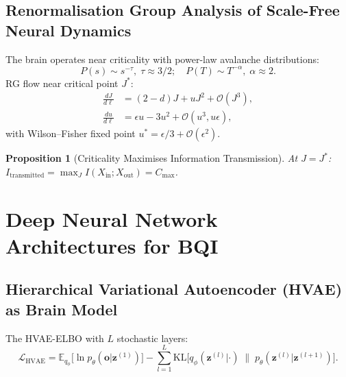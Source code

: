 \documentclass[12pt,a4paper]{article}
\theoremstyle{plain}
\newtheorem{proposition}[theorem]{Proposition}
\theoremstyle{definition}
\theoremstyle{remark}
\newcommand{\KL}{\mathrm{KL}}
\newcommand{\E}{\mathbb{E}}
\begin{document}

\subsection{Renormalisation Group Analysis of Scale-Free Neural Dynamics}

The brain operates near criticality \citep{BeggsPlebs2003} with power-law avalanche distributions:
\begin{equation}
P(s)\sim s^{-\tau},\;\tau\approx 3/2;\quad P(T)\sim T^{-\alpha},\;\alpha\approx 2.
\end{equation}
RG flow near critical point $J^*$:
\begin{align}
\frac{dJ}{d\ell} &= (2-d)J + uJ^2 + \mathcal{O}(J^3),\\
\frac{du}{d\ell} &= \epsilon u - 3u^2 + \mathcal{O}(u^3,u\epsilon),
\end{align}
with Wilson--Fisher fixed point $u^* = \epsilon/3 + \mathcal{O}(\epsilon^2)$.

\begin{proposition}[Criticality Maximises Information Transmission]
\label{prop:crit}
At $J=J^*$:
$I_\mathrm{transmitted} = \max_J I(X_\mathrm{in};X_\mathrm{out}) = C_\mathrm{max}$.
\end{proposition}

\section{Deep Neural Network Architectures for BQI}
\label{sec:deep_nn}

\subsection{Hierarchical Variational Autoencoder (HVAE) as Brain Model}

The HVAE-ELBO with $L$ stochastic layers:
\begin{equation}
\mathcal{L}_\mathrm{HVAE} = \E_{q_\phi}\bigl[\ln p_\theta(\mathbf{o}|\mathbf{z}^{(1)})\bigr]
- \sum_{l=1}^L\KL\!\bigl[q_\phi(\mathbf{z}^{(l)}|\cdot)\;\|\;p_\theta(\mathbf{z}^{(l)}|\mathbf{z}^{(l+1)})\bigr].
\label{eq:HVAE_ELBO}
\end{equation}

\end{document}
